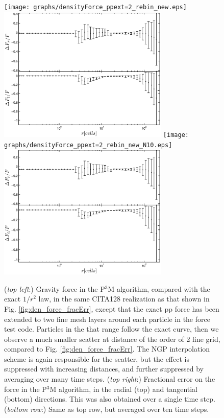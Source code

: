  \begin{figure}%
  \begin{center}
    \texttt{[image: graphs/densityForce\_ppext=2\_rebin\_new.eps]}
    \includegraphics[width=3.2in]{graphs/densityForce_fracErr_ppext=2_rebin_new.eps}
     \texttt{[image: graphs/densityForce\_ppext=2\_rebin\_new\_N10.eps]}
    \includegraphics[width=3.2in]{graphs/densityForce_fracErr_ppext=2_rebin_new_N10.eps}
    \caption{({\it top left}:) Gravity force in the P$^3$M algorithm, compared with the exact $1/r^{2}$ law,
  in the same CITA128 realization as that shown in Fig. \ref{fig:den_force_fracErr}, 
  except that the exact pp force has been extended to two fine mesh layers around each particle
  in the force test code.
  Particles in the that range follow the exact curve, then we observe a much smaller scatter at 
  distance of the order of 2 fine grid, compared to Fig. \ref{fig:den_force_fracErr}. 
  The NGP interpolation scheme is again responsible for the scatter, but the effect is suppressed with increasing distances, and further suppressed by averaging over many time steps.
  ({\it top right}:) Fractional error on the force in the P$^3$M algorithm, in the radial (top) and tangential (bottom) directions.
  This was also obtained over a single time step.
  ({\it bottom row}:) Same as top row, but averaged over ten time steps.
    \label{fig:den_force_fracErr_ppext6}}
\end{center}
\end{figure}

